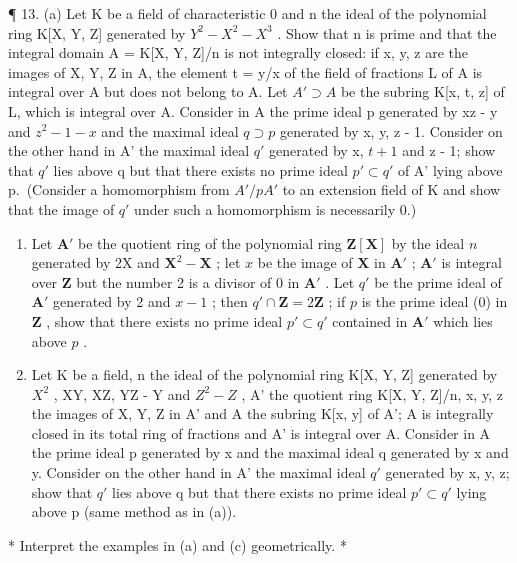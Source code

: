 ¶ 13. (a) Let K be a field of characteristic 0 and n the ideal of the polynomial ring K{[}X, Y, Z{]} generated by \(Y^{2} - X^{2} - X^{3}\) . Show that n is prime and that the integral domain A = K{[}X, Y, Z{]}/n is not integrally closed: if x, y, z are the images of X, Y, Z in A, the element t = y/x of the field of fractions L of A is integral over A but does not belong to A. Let \(A' \supset A\) be the subring K{[}x, t, z{]} of L, which is integral over A. Consider in A the prime ideal p generated by xz - y and \(z^{2} - 1 - x\) and the maximal ideal \(q \supset p\) generated by x, y, z - 1. Consider on the other hand in A' the maximal ideal \(q'\) generated by x, \(t + 1\) and z - 1; show that \(q'\) lies above q but that there exists no prime ideal \(p' \subset q'\) of A' lying above p.~(Consider a homomorphism from \(A'/pA'\) to an extension field of K and show that the image of \(q'\) under such a homomorphism is necessarily 0.)

\begin{enumerate}
\def\labelenumi{(\alph{enumi})}
\setcounter{enumi}{1}
\item
  Let \(\mathbf{A}'\) be the quotient ring of the polynomial ring \(\mathbf{Z}[\mathbf{X}]\) by the ideal \(n\) generated by 2X and \(\mathbf{X}^2 -\mathbf{X}\) ; let \(x\) be the image of \(\mathbf{X}\) in \(\mathbf{A}'\) ; \(\mathbf{A}'\) is integral over \(\mathbf{Z}\) but the number 2 is a divisor of 0 in \(\mathbf{A}'\) . Let \(q'\) be the prime ideal of \(\mathbf{A}'\) generated by 2 and \(x - 1\) ; then \(q' \cap \mathbf{Z} = 2\mathbf{Z}\) ; if \(p\) is the prime ideal (0) in \(\mathbf{Z}\) , show that there exists no prime ideal \(p' \subset q'\) contained in \(\mathbf{A}'\) which lies above \(p\) .
\item
  Let K be a field, n the ideal of the polynomial ring K{[}X, Y, Z{]} generated by \(X^{2}\) , XY, XZ, YZ - Y and \(Z^{2} - Z\) , A' the quotient ring K{[}X, Y, Z{]}/n, x, y, z the images of X, Y, Z in A' and A the subring K{[}x, y{]} of A'; A is integrally closed in its total ring of fractions and A' is integral over A. Consider in A the prime ideal p generated by x and the maximal ideal q generated by x and y. Consider on the other hand in A' the maximal ideal \(q'\) generated by x, y, z; show that \(q'\) lies above q but that there exists no prime ideal \(p' \subset q'\) lying above p (same method as in (a)).
\end{enumerate}

* Interpret the examples in (a) and (c) geometrically. *

